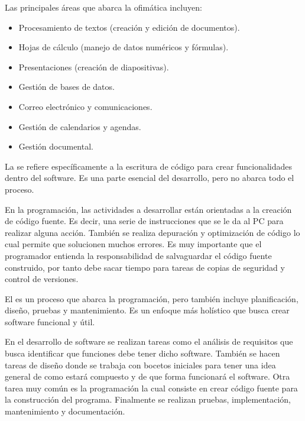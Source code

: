 \documentclass[letterpaper,10pt,spanish]{sphinxmanual}
\begin{document}
\sphinxAtStartPar
Las principales áreas que abarca la ofimática incluyen:
\begin{itemize}
\item {} 
\sphinxAtStartPar
Procesamiento de textos (creación y edición de documentos).

\item {} 
\sphinxAtStartPar
Hojas de cálculo (manejo de datos numéricos y fórmulas).

\item {} 
\sphinxAtStartPar
Presentaciones (creación de diapositivas).

\item {} 
\sphinxAtStartPar
Gestión de bases de datos.

\item {} 
\sphinxAtStartPar
Correo electrónico y comunicaciones.

\item {} 
\sphinxAtStartPar
Gestión de calendarios y agendas.

\item {} 
\sphinxAtStartPar
Gestión documental.

\end{itemize}

\sphinxAtStartPar
La  se refiere específicamente a la escritura de código para crear funcionalidades dentro del software. Es una parte esencial del desarrollo, pero no abarca todo el proceso.

\sphinxAtStartPar
En la programación, las actividades a desarrollar están orientadas a la creación de código fuente. Es decir, una serie de instrucciones que se le da al PC para realizar alguna acción. También se realiza depuración y optimización de código lo cual permite que solucionen muchos errores. Es muy importante que el programador entienda la responsabilidad de salvaguardar el código fuente construido, por tanto debe sacar tiempo para tareas de copias de seguridad y control de versiones.

\sphinxAtStartPar
El  es un proceso que abarca la programación, pero también incluye planificación, diseño, pruebas y mantenimiento. Es un enfoque más holístico que busca crear software funcional y útil.

\sphinxAtStartPar
En el desarrollo de software se realizan tareas como el análisis de requisitos que busca identificar que funciones debe tener dicho software. También se hacen tareas de diseño donde se trabaja con bocetos iniciales para tener una idea general de como estará compuesto y de que forma funcionará el software. Otra tarea muy común es la programación la cual consiste en crear código fuente para la construcción del programa. Finalmente se realizan pruebas, implementación, mantenimiento y documentación.
\end{document}
